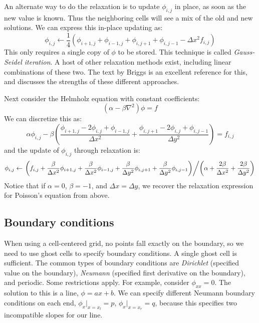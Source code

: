An alternate way to do the relaxation is to update $\phi_{i,j}$ in
place, as soon as the new value is known.  Thus the neighboring cells
will see a mix of the old and new solutions.  We can express this in-place
updating as:
\begin{equation}
\phi_{i,j} \leftarrow \frac{1}{4} (\phi_{i+1,j} + \phi_{i-1,j} + 
                                   \phi_{i,j+1} + \phi_{i,j-1} - 
                                   \Delta x^2 f_{i,j} )
\end{equation}
This only requires a single copy of $\phi$ to be stored.  This
technique is called {\em Gauss-Seidel iteration}.  A host of other
relaxation methods exist, including linear combinations of these two.
The text by Briggs is an excellent reference for this, and discusses
the strengths of these different approaches.


Next consider the Helmholz equation with constant coefficients:
\begin{equation}
(\alpha - \beta \nabla^2) \phi = f
\end{equation}
We can discretize this as:
\begin{equation}
\alpha \phi_{i,j} - \beta \left ( 
    \frac{\phi_{i+1,j} - 2 \phi_{i,j} + \phi_{i-1,j}}{\Delta x^2} +
    \frac{\phi_{i,j+1} - 2 \phi_{i,j} + \phi_{i,j-1}}{\Delta y^2} \right )
= f_{i,j}
\end{equation}
and the update of $\phi_{i,j}$ through relaxation is:
\begin{equation}
\phi_{i,j} \leftarrow
     \left . \left ( f_{i,j} + \frac{\beta}{\Delta x^2} \phi_{i+1,j}
                             + \frac{\beta}{\Delta x^2} \phi_{i-1,j}
                             + \frac{\beta}{\Delta y^2} \phi_{i,j+1}
                             + \frac{\beta}{\Delta y^2} \phi_{i,j-1} \right ) 
\middle / \left ( \alpha + \frac{2 \beta}{\Delta x^2} + \frac{2 \beta}{\Delta y^2} \right ) \right .
\end{equation}
Notice that if $\alpha = 0$, $\beta = -1$, and $\Delta x = \Delta y$, we 
recover the relaxation expression for Poisson's equation from above.


\subsection{Boundary conditions}

When using a cell-centered grid, no points fall exactly on the
boundary, so we need to use ghost cells to specify boundary conditions.
A single ghost cell is sufficient.  The common types of boundary
conditions are {\em Dirichlet} (specified value on the boundary), {\em
  Neumann} (specified first derivative on the boundary), and periodic.
Some restrictions apply.  For example, consider $\phi_{xx} = 0$.  The
solution to this is a line, $\phi = ax + b$.  We can specify different
Neumann boundary conditions on each end, $\phi_x |_{x=x_l} = p$,
$\phi_x |_{x = x_r} = q$, because this specifies two incompatible
slopes for our line.

